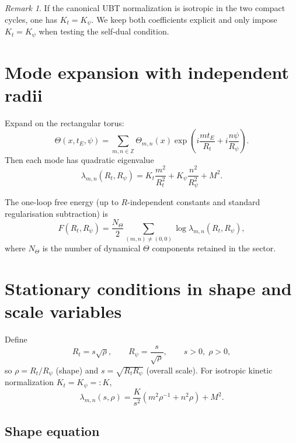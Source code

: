 \documentclass[12pt,a4paper]{article}
\theoremstyle{definition}
\theoremstyle{remark}
\newtheorem{remark}[theorem]{Remark}
\begin{document}
\begin{remark}
If the canonical UBT normalization is isotropic in the two compact cycles, one
has $K_t=K_\psi$.  We keep both coefficients explicit and only impose
$K_t=K_\psi$ when testing the self-dual condition.
\end{remark}

\section{Mode expansion with independent radii}

Expand on the rectangular torus:
\begin{equation}
\Theta(x,t_E,\psi)
=\sum_{m,n\in\mathbb Z}\Theta_{m,n}(x)
\exp\!\left(i\frac{m t_E}{R_t}+i\frac{n\psi}{R_\psi}\right).
\label{eq:mode-expansion}
\end{equation}
Then each mode has quadratic eigenvalue
\begin{equation}
\lambda_{m,n}(R_t,R_\psi)
=K_t\frac{m^2}{R_t^2}+K_\psi\frac{n^2}{R_\psi^2}+M^2.
\label{eq:eigenvalue}
\end{equation}

The one-loop free energy (up to $R$-independent constants and standard
regularisation subtraction) is
\begin{equation}
F(R_t,R_\psi)
=\frac{N_\Theta}{2}\sum_{(m,n)\neq(0,0)}
\log\lambda_{m,n}(R_t,R_\psi),
\label{eq:F-main}
\end{equation}
where $N_\Theta$ is the number of dynamical $\Theta$ components retained in the
sector.

\section{Stationary conditions in shape and scale variables}

Define
\begin{equation}
R_t=s\sqrt{\rho},\qquad R_\psi=\frac{s}{\sqrt{\rho}},
\qquad s>0,\;\rho>0,
\end{equation}
so $\rho=R_t/R_\psi$ (shape) and $s=\sqrt{R_tR_\psi}$ (overall scale).
For isotropic kinetic normalization $K_t=K_\psi=:K$,
\begin{equation}
\lambda_{m,n}(s,\rho)=\frac{K}{s^2}\left(m^2\rho^{-1}+n^2\rho\right)+M^2.
\label{eq:lambda-s-rho}
\end{equation}

\subsection{Shape equation}
\end{document}
